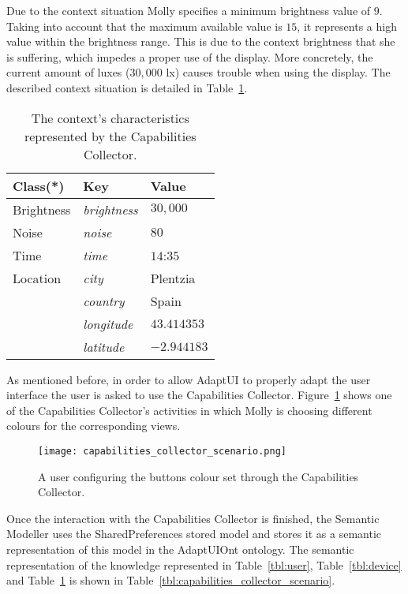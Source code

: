 Due to the context situation Molly specifies a minimum brightness value of $9$.
Taking into account that the maximum available value is $15$, it represents a
high value within the brightness range. This is due to the context brightness 
that she is suffering, which impedes a proper use of the display. More concretely,
the current amount of luxes ($30,000$ \ac{lx}) causes trouble when using the
display. The described context situation is detailed in Table~\ref{tbl:context}.

\begin{table}
 \caption{The context's characteristics represented by the Capabilities Collector.}
 \label{tbl:context}
 \footnotesize
 \centering
\begin{tabular}{l l l}
  \hline 
  \textbf{Class(*)}& \textbf{Key} & \textbf{Value}		\\
  \hline
  Brightness	& \textit{brightness}		& $30,000$	\\
  Noise		& \textit{noise}		& $80$		\\
  Time		& \textit{time}			& $14$:$35$	\\
  Location	& \textit{city}			& Plentzia	\\
		& \textit{country}		& Spain		\\
		& \textit{longitude}		& $43.414353$	\\
		& \textit{latitude} 		& $-2.944183$	\\	
  \hline
\end{tabular}
\end{table}


As mentioned before, in order to allow AdaptUI to properly adapt the user 
interface the user is asked to use the Capabilities Collector. 
Figure~\ref{fig:capabilities_collector_scenario} shows one of the Capabilities
Collector's activities in which Molly is choosing different colours for the
corresponding views.

\begin{figure}
\centering
\texttt{[image: capabilities\_collector\_scenario.png]}
\caption{A user configuring the buttons colour set through the Capabilities Collector.}
\label{fig:capabilities_collector_scenario}
\end{figure}

Once the interaction with the Capabilities Collector is finished, the Semantic 
Modeller uses the SharedPreferences stored model and stores it as a semantic 
representation of this model in the AdaptUIOnt ontology. The semantic representation
of the knowledge represented in Table~\ref{tbl:user}, Table~\ref{tbl:device} and
Table~\ref{tbl:context} is shown in Table~\ref{tbl:capabilities_collector_scenario}.


